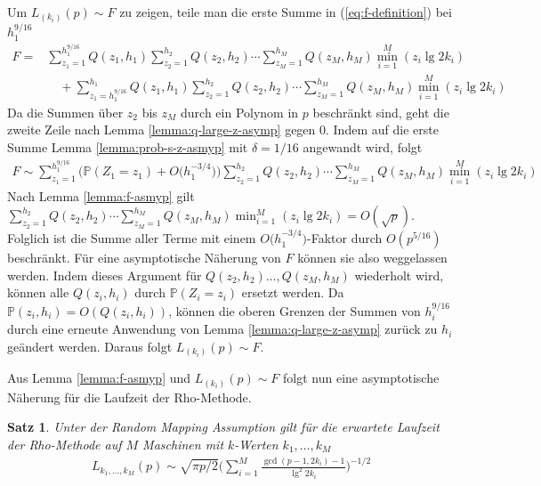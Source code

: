 \documentclass[a4paper, 11pt, ngerman]{article}
\renewcommand{\P}{\mathbb{P}}
\theoremstyle{definition}
\theoremstyle{plain}
\newtheorem{theorem}{Satz}
\theoremstyle{remark}
\begin{document}
Um $L_{(k_i)}(p) \sim F$ zu zeigen, teile man die erste Summe in (\ref{eq:f-definition}) bei $h_1^{9/16}$
\begin{align*}
    F = & \sum_{z_1 = 1}^{h_1^{9/16}} Q(z_1, h_1)
    \sum_{z_2 = 1}^{h_2} Q(z_2, h_2)    \cdots
    \sum_{z_M = 1}^{h_M} Q(z_M, h_M)
    \min_{i = 1}^M (z_i \lg 2k_i)                 \\
        & \quad +
    \sum_{z_1 = h_1^{9/16}}^{h_1} Q(z_1, h_1)
    \sum_{z_2 = 1}^{h_2} Q(z_2, h_2)    \cdots
    \sum_{z_M = 1}^{h_M} Q(z_M, h_M)
    \min_{i = 1}^M (z_i \lg 2k_i)
\end{align*}
Da die Summen über $z_2$ bis $z_M$ durch ein Polynom in $p$ beschränkt sind, geht die zweite Zeile nach Lemma \ref{lemma:q-large-z-asymp} gegen 0. Indem auf die erste Summe Lemma \ref{lemma:prob-s-z-asmyp} mit $\delta = 1/16$ angewandt wird, folgt
\begin{align*}
    F \sim \sum_{z_1 = 1}^{h_1^{9/16}}
    \Big ( \P(Z_1 = z_1) + O \Big ( h_1^{-3/4} \Big ) \Big )
    \sum_{z_2 = 1}^{h_2} Q(z_2, h_2)    \cdots
    \sum_{z_M = 1}^{h_M} Q(z_M, h_M)
    \min_{i = 1}^M (z_i \lg 2k_i)
\end{align*}
Nach Lemma \ref{lemma:f-asmyp} gilt $\sum_{z_2 = 1}^{h_2} Q(z_2, h_2) \cdots \sum_{z_M = 1}^{h_M} Q(z_M, h_M) \min_{i = 1}^M (z_i \lg 2k_i) = O(\sqrt p)$. Folglich ist die Summe aller Terme mit einem $O \big (h_1^{-3/4} \big )$-Faktor durch $O(p^{5/16})$ beschränkt. Für eine asymptotische Näherung von $F$ können sie also weggelassen werden. Indem dieses Argument für $Q(z_2, h_2) \dots, Q(z_M, h_M)$ wiederholt wird, können alle $Q(z_i, h_i)$ durch $\P(Z_i = z_i)$ ersetzt werden. Da $\P(z_i, h_i) = O(Q(z_i, h_i))$, können die oberen Grenzen der Summen von $h_i^{9/16}$ durch eine erneute Anwendung von Lemma \ref{lemma:q-large-z-asymp} zurück zu $h_i$ geändert werden. Daraus folgt $L_{(k_i)}(p) \sim F$.

Aus Lemma \ref{lemma:f-asmyp} und $L_{(k_i)}(p) \sim F$ folgt nun eine asymptotische Näherung für die Laufzeit der Rho-Methode.
\begin{theorem}
    Unter der Random Mapping Assumption gilt für die erwartete Laufzeit der Rho-Methode auf $M$ Maschinen mit $k$-Werten $k_1, \dots, k_M$
    \begin{align}
        L_{k_1, \dots, k_M}(p) \sim
        \sqrt{\pi p / 2} \Bigg ( \sum_{i = 1}^M
        \frac {\gcd(p - 1, 2k_i) - 1} {\lg^2 2k_i} \Bigg )^{-1/2}
        \label{eq:lki-asymp}
    \end{align}

    \label{theorem:lki-asymp}
\end{theorem}
\end{document}
